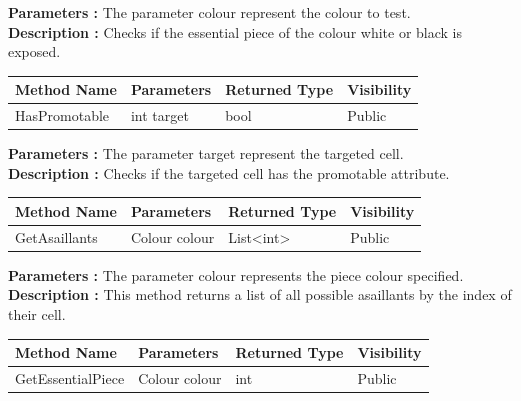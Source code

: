 \documentclass[12pt]{article}
\begin{document}
\textbf{Parameters :} The parameter colour represent the colour
to test.
\\

\textbf{Description :} Checks if the essential piece of the colour white or black
is exposed.

\begin{table}[H]
    \begin{tabular}{|l|l|l|l|}
    \hline
    \rowcolor[HTML]{EFEFEF} 
    \cellcolor[HTML]{EFEFEF}\textbf{Method Name} & \textbf{Parameters}     & \textbf{Returned Type} & \textbf{Visibility} \\ \hline
    HasPromotable                                & int target              & bool                   & Public              \\ \hline
    \end{tabular}
\end{table}

\textbf{Parameters :} The parameter target represent the targeted cell.
\\

\textbf{Description :} Checks if the targeted cell has the promotable attribute.

\begin{table}[H]
    \begin{tabular}{|l|l|l|l|}
    \hline
    \rowcolor[HTML]{EFEFEF} 
    \cellcolor[HTML]{EFEFEF}\textbf{Method Name} & \textbf{Parameters}     & \textbf{Returned Type} & \textbf{Visibility} \\ \hline
    GetAsaillants                                & Colour colour           & List\textless{}int\textgreater{}                   & Public              \\ \hline
    \end{tabular}
\end{table}

\textbf{Parameters :} The parameter colour represents the piece colour specified.
\textbf{Description :} This method returns a list of all possible asaillants by the index of their cell.

\begin{table}[H]
    \begin{tabular}{|l|l|l|l|}
    \hline
    \rowcolor[HTML]{EFEFEF} 
    \cellcolor[HTML]{EFEFEF}\textbf{Method Name} & \textbf{Parameters}     & \textbf{Returned Type} & \textbf{Visibility} \\ \hline
    GetEssentialPiece                            & Colour colour           & int                   & Public              \\ \hline
    \end{tabular}
\end{table}
\end{document}
